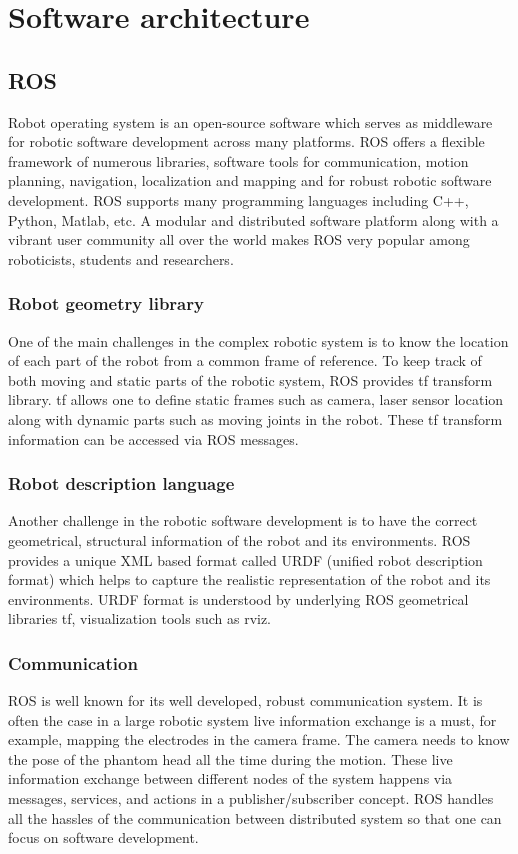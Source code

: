 \section{Software architecture}

\subsection{ROS} Robot operating system \cite{ROS} is an open-source software which serves as middleware for robotic software development across many platforms. ROS offers a flexible framework of numerous libraries, software tools for communication, motion planning, navigation, localization and mapping and for robust robotic software development. ROS supports many programming languages including C++, Python, Matlab, etc. A modular and distributed software platform along with a vibrant user community all over the world makes ROS very popular among roboticists, students and researchers.

\subsubsection{Robot geometry library} One of the main challenges in the complex robotic system is to know the location of each part of the robot from a common frame of reference. To keep track of both moving and static parts of the robotic system, ROS provides tf transform library. tf allows one to define static frames such as camera, laser sensor location along with dynamic parts such as moving joints in the robot. These tf transform information can be accessed via ROS messages.  

\subsubsection{Robot description language} Another challenge in the robotic software development is to have the correct geometrical, structural information of the robot and its environments. ROS provides a unique XML based format called URDF (unified robot description format) which helps to capture the realistic representation of the robot and its environments. URDF format is understood by underlying ROS geometrical libraries tf, visualization tools such as rviz.

\subsubsection{Communication} ROS is well known for its well developed, robust communication system. It is often the case in a large robotic system live information exchange is a must, for example, mapping the electrodes in the camera frame. The camera needs to know the pose of the phantom head all the time during the motion. These live information exchange between different nodes of the system happens via messages, services, and actions in a publisher/subscriber concept. ROS handles all the hassles of the communication between distributed system so that one can focus on software development. 


